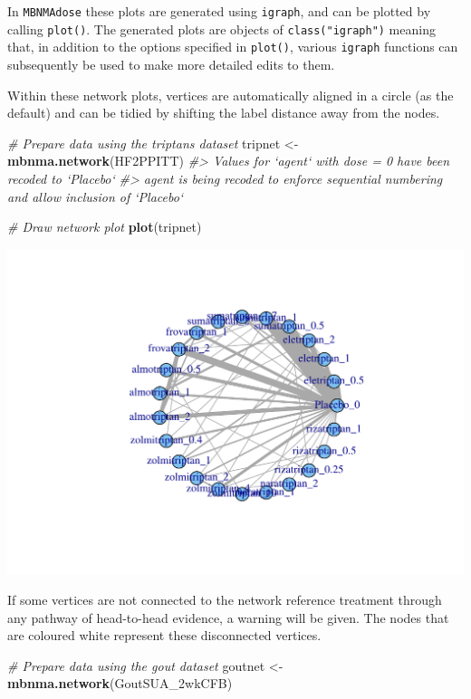 \documentclass[]{article}
\newenvironment{Shaded}{\begin{snugshade}}{\end{snugshade}}
\newcommand{\CommentTok}[1]{\textcolor[rgb]{0.56,0.35,0.01}{\textit{#1}}}
\newcommand{\KeywordTok}[1]{\textcolor[rgb]{0.13,0.29,0.53}{\textbf{#1}}}
\newcommand{\NormalTok}[1]{#1}
\newcommand{\StringTok}[1]{\textcolor[rgb]{0.31,0.60,0.02}{#1}}
\begin{document}
In \texttt{MBNMAdose} these plots are generated using \texttt{igraph},
and can be plotted by calling \texttt{plot()}. The generated plots are
objects of \texttt{class("igraph")} meaning that, in addition to the
options specified in \texttt{plot()}, various \texttt{igraph} functions
can subsequently be used to make more detailed edits to them.

Within these network plots, vertices are automatically aligned in a
circle (as the default) and can be tidied by shifting the label distance
away from the nodes.

\begin{Shaded}
\begin{Highlighting}[]
\CommentTok{# Prepare data using the triptans dataset}
\NormalTok{tripnet <-}\StringTok{ }\KeywordTok{mbnma.network}\NormalTok{(HF2PPITT)}
\CommentTok{#> Values for `agent` with dose = 0 have been recoded to `Placebo`}
\CommentTok{#> agent is being recoded to enforce sequential numbering and allow inclusion of `Placebo`}

\CommentTok{# Draw network plot}
\KeywordTok{plot}\NormalTok{(tripnet)}
\end{Highlighting}
\end{Shaded}

\includegraphics{mbnmadose_files/figure-latex/unnamed-chunk-6-1.pdf}

If some vertices are not connected to the network reference treatment
through any pathway of head-to-head evidence, a warning will be given.
The nodes that are coloured white represent these disconnected vertices.

\begin{Shaded}
\begin{Highlighting}[]
\CommentTok{# Prepare data using the gout dataset}
\NormalTok{goutnet <-}\StringTok{ }\KeywordTok{mbnma.network}\NormalTok{(GoutSUA_2wkCFB)}
\end{Highlighting}
\end{Shaded}
\end{document}

